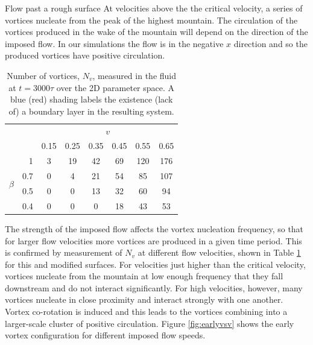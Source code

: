 \begin{chapter}{\label{cha:afm}Flow past a rough surface}
At velocities above the the critical velocity, a series of vortices nucleate from the peak of the highest mountain. The circulation of the vortices produced in the wake of the mountain will depend on the direction of the imposed flow. In our simulations the flow is in the negative $x$ direction and so the produced vortices have positive circulation.

\begin{table}[b]
\centering
\begin{tabular}{cr|cccccc}
   & & \multicolumn{6}{c}{$v$}\\
   & & 0.15 & 0.25 & 0.35 & 0.45 & 0.55 & 0.65 \\
   \hline
  \multirow{4}{*}{$\beta$} & 1 & \cellcolor{blue!50}3 & \cellcolor{blue!50}19 & \cellcolor{blue!50}42 & \cellcolor{red!50}69 & \cellcolor{red!50}120 & \cellcolor{red!50}176 \\
   &0.7& 0 & \cellcolor{blue!50}4 &  \cellcolor{blue!50}21 & \cellcolor{red!50}54 & \cellcolor{red!50}85 & \cellcolor{red!50}107 \\
   &0.5& 0 & 0 &  \cellcolor{blue!50}13 & \cellcolor{blue!50}32 & \cellcolor{red!50}60 & \cellcolor{red!50}94 \\
   &0.4& 0 & 0 &   0 & \cellcolor{blue!50}18 & \cellcolor{blue!50}43 & \cellcolor{red!50}53 \\
\end{tabular}
\caption{\label{tbl:nv_bl}Number of vortices, $N_v$, measured in the fluid at $t=3000\tau$ over the 2D parameter space. A blue (red) shading labels the existence (lack of) a boundary layer in the resulting system.}
\end{table}

The strength of the imposed flow affects the vortex nucleation frequency, so that for larger flow velocities more vortices are produced in a given time period. This is confirmed by measurement of $N_v$ at different flow velocities, shown in Table \ref{tbl:nv_bl} for this and modified surfaces. For velocities just higher than the critical velocity, vortices nucleate from the mountain at low enough frequency that they fall downstream and do not interact significantly. For high velocities, however, many vortices nucleate in close proximity and interact strongly with one another. Vortex co-rotation is induced and this leads to the vortices combining into a larger-scale cluster of positive circulation. Figure \ref{fig:earlyvsv} shows the early vortex configuration for different imposed flow speeds. 


\end{chapter}
